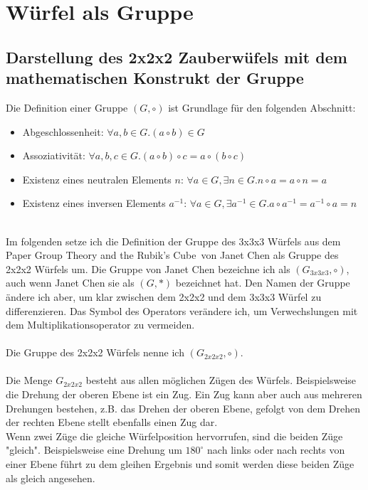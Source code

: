 \documentclass[12pt,a4paper, usenames, dvipsnames]{article}
\begin{document}
\section{Würfel als Gruppe}

\subsection*{Darstellung des 2x2x2 Zauberwüfels mit dem mathematischen Konstrukt der Gruppe} 

Die Definition einer Gruppe $(G, \circ)$ ist Grundlage für den folgenden Abschnitt:
\begin{itemize}
\item Abgeschlossenheit: $\forall a,b \in G.(a \circ b) \in G $
\item Assoziativität: $\forall a,b,c \in G.(a \circ b) \circ c = a \circ (b \circ c)$
\item Existenz eines neutralen Elements $n$: $\forall a \in G, \exists n \in G.n \circ a = a \circ n = a$ 
\item Existenz eines inversen Elements $a^{-1}$: $\forall a \in G, \exists a^{-1} \in G. a \circ a^{-1} = a^{-1} \circ a = n$ 
\end{itemize}
\ \\
Im folgenden setze ich die Definition der Gruppe des 3x3x3 Würfels aus dem Paper \glqq Group Theory and the Rubik's Cube\grqq \  von Janet Chen \cite{JC} als Gruppe des 2x2x2 Würfels um. Die Gruppe von Janet Chen bezeichne ich als $(G_{3x3x3}, \circ)$, auch wenn Janet Chen sie als $(G, *)$ bezeichnet hat. Den Namen der Gruppe ändere ich aber, um klar zwischen dem 2x2x2 und dem 3x3x3 Würfel zu differenzieren. Das Symbol des Operators verändere ich, um Verwechslungen mit dem Multiplikationsoperator zu vermeiden. \\
\\ 
Die Gruppe des 2x2x2 Würfels nenne ich $(G_{2x2x2}, \circ)$. \\
\\
Die Menge $G_{2x2x2}$ besteht aus allen möglichen Zügen des Würfels. Beispielsweise die Drehung der oberen Ebene ist ein Zug. Ein Zug kann aber auch aus mehreren Drehungen bestehen, z.B. das Drehen der oberen Ebene, gefolgt von dem Drehen der rechten Ebene stellt ebenfalls einen Zug dar. \\
Wenn zwei Züge die gleiche Würfelposition hervorrufen, sind die beiden Züge "gleich". Beispielsweise eine Drehung um $180^{\circ}$ nach links oder nach rechts von einer Ebene führt zu dem gleihen Ergebnis und somit werden diese beiden Züge als gleich angesehen. \\
\end{document}
